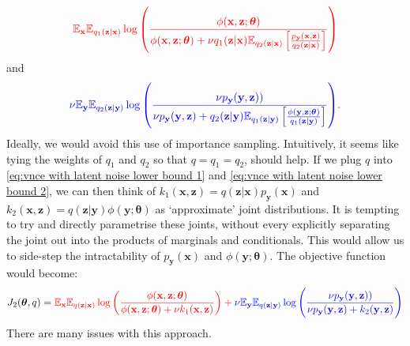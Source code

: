 \documentclass[11pt, oneside]{article}
\newcommand{\thetab}{{\boldsymbol{\theta}}}
\newcommand{\pnn}{\phi}
\newcommand{\pnoise}{p_{ \mathbf y}}
\newcommand{\x}{{\mathbf x}}
\newcommand{\y}{{\mathbf y}}
\newcommand{\z}{{\mathbf z}}
\newcommand{\E}{\mathbb{E}}
\newcommand{\Ex}{\E_{\x}}
\newcommand{\Ey}{\E_{\y}}
\theoremstyle{definition}
\begin{document}
{\begin{align}
\label{eq:variational noise, term 1 with importance sampling}
    \color{red}{\Ex \mathbb{E}_{q_1(\z | \x)} \log \left( \frac{\pnn(\x,\z; \thetab)}{\pnn(\x,\z; \thetab) + \nu q_1(\z | \x) \mathbb{E}_{q_2(\z | \x)} \left[ \frac{\pnoise(\x, \z)}{q_2(\z | \x)} \right]} \right)}
\end{align}
and 
\begin{align}
\label{eq:variational noise, term 2 with importance sampling}
    \color{blue}{ \nu \Ey \mathbb{E}_{q_2(\z | \y)} \log \left( \frac{\nu \pnoise(\y, \z))}{\nu \pnoise(\y, \z) +  q_2(\z | \y) \mathbb{E}_{q_1(\z | \y)}\left[ \frac{\pnn(\y , \z; \thetab)}{q_1(\z | \y)} \right] } \right)}.
\end{align}
Ideally, we would avoid this use of importance sampling. Intuitively, it seems like tying the weights of $q_1$ and $q_2$ so that $q = q_1 = q_2$, should help. If we plug $q$ into \ref{eq:vnce with latent noise lower bound 1} and \ref{eq:vnce with latent noise lower bound 2}, we can then think of $k_1(\x, \z) = q(\z |\x)\pnoise(\x)$ and $k_2(\x, \z) = q(\z | \y) \pnn(\y ; \thetab)$ as `approximate' joint distributions. It is tempting to try and directly parametrise these joints, without every explicitly separating the joint out into the products of marginals and conditionals. This would allow us to side-step the intractability of $\pnoise(\x)$ and $\pnn(\y; \thetab)$. The objective function would become:
\begin{align}
\label{eq:variational noise objective function}
    J_2(\thetab, q) = \color{red}{\Ex \mathbb{E}_{q(\z | \x)} \log \left( \frac{\pnn(\x,\z; \thetab)}{\pnn(\x,\z; \thetab) + \nu k_1(\x, \z)} \right)}
    + \color{blue}{ \nu \Ey \mathbb{E}_{q(\z | \y)} \log \left( \frac{\nu \pnoise(\y, \z))}{\nu \pnoise(\y, \z) +  k_2(\y, \z) } \right)}
\end{align}
There are many issues with this approach. 

}
\end{document}
